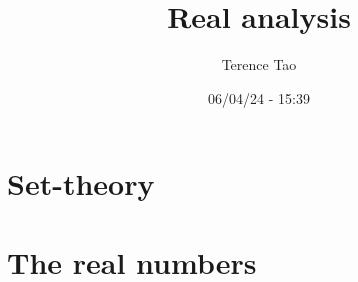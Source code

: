 \documentclass[11pt]{elegantbook}
\title{Real analysis}
\subtitle{Terence Tao}
\date{06/04/24 - 15:39}
\begin{document}
\maketitle

\frontmatter
\tableofcontents

\mainmatter

\setcounter{chapter}{2}
\chapter{Set-theory}


\setcounter{chapter}{4}
\chapter{The real numbers}

\end{document}
